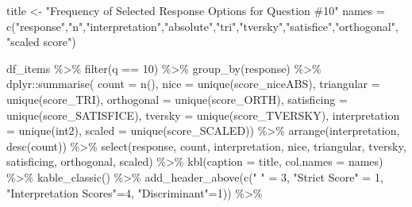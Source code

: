 \documentclass[
  letterpaper,
  DIV=11,
  numbers=noendperiod]{scrreprt}
\newenvironment{Shaded}{\begin{snugshade}}{\end{snugshade}}
\newcommand{\AttributeTok}[1]{\textcolor[rgb]{0.40,0.45,0.13}{#1}}
\newcommand{\DecValTok}[1]{\textcolor[rgb]{0.68,0.00,0.00}{#1}}
\newcommand{\FunctionTok}[1]{\textcolor[rgb]{0.28,0.35,0.67}{#1}}
\newcommand{\NormalTok}[1]{\textcolor[rgb]{0.00,0.23,0.31}{#1}}
\newcommand{\OtherTok}[1]{\textcolor[rgb]{0.00,0.23,0.31}{#1}}
\newcommand{\SpecialCharTok}[1]{\textcolor[rgb]{0.37,0.37,0.37}{#1}}
\newcommand{\StringTok}[1]{\textcolor[rgb]{0.13,0.47,0.30}{#1}}
\begin{document}
\begin{Shaded}
\begin{Highlighting}[]
\NormalTok{title }\OtherTok{\textless{}{-}} \StringTok{"Frequency of Selected Response Options for Question \#10"}
\NormalTok{names }\OtherTok{=} \FunctionTok{c}\NormalTok{(}\StringTok{"response"}\NormalTok{,}\StringTok{"n"}\NormalTok{,}\StringTok{"interpretation"}\NormalTok{,}\StringTok{"absolute"}\NormalTok{,}\StringTok{"tri"}\NormalTok{,}\StringTok{"tversky"}\NormalTok{,}\StringTok{"satisfice"}\NormalTok{,}\StringTok{"orthogonal"}\NormalTok{, }\StringTok{"scaled score"}\NormalTok{)}

\NormalTok{df\_items }\SpecialCharTok{\%\textgreater{}\%} \FunctionTok{filter}\NormalTok{(q }\SpecialCharTok{==} \DecValTok{10}\NormalTok{) }\SpecialCharTok{\%\textgreater{}\%} \FunctionTok{group\_by}\NormalTok{(response) }\SpecialCharTok{\%\textgreater{}\%}
\NormalTok{  dplyr}\SpecialCharTok{::}\FunctionTok{summarise}\NormalTok{( }\AttributeTok{count =} \FunctionTok{n}\NormalTok{(),}
                    \AttributeTok{nice =} \FunctionTok{unique}\NormalTok{(score\_niceABS),}
                    \AttributeTok{triangular =} \FunctionTok{unique}\NormalTok{(score\_TRI),}
                    \AttributeTok{orthogonal =}  \FunctionTok{unique}\NormalTok{(score\_ORTH),}
                    \AttributeTok{satisficing =}  \FunctionTok{unique}\NormalTok{(score\_SATISFICE),}
                    \AttributeTok{tversky =} \FunctionTok{unique}\NormalTok{(score\_TVERSKY),}
                    \AttributeTok{interpretation =} \FunctionTok{unique}\NormalTok{(int2),}
                    \AttributeTok{scaled =} \FunctionTok{unique}\NormalTok{(score\_SCALED)) }\SpecialCharTok{\%\textgreater{}\%}
  \FunctionTok{arrange}\NormalTok{(interpretation, }\FunctionTok{desc}\NormalTok{(count)) }\SpecialCharTok{\%\textgreater{}\%}
  \FunctionTok{select}\NormalTok{(response, count, interpretation, nice,}
\NormalTok{         triangular, tversky, satisficing, orthogonal, scaled) }\SpecialCharTok{\%\textgreater{}\%}
  \FunctionTok{kbl}\NormalTok{(}\AttributeTok{caption =}\NormalTok{ title, }\AttributeTok{col.names =}\NormalTok{ names) }\SpecialCharTok{\%\textgreater{}\%}  \FunctionTok{kable\_classic}\NormalTok{() }\SpecialCharTok{\%\textgreater{}\%}
  \FunctionTok{add\_header\_above}\NormalTok{(}\FunctionTok{c}\NormalTok{(}\StringTok{" "} \OtherTok{=} \DecValTok{3}\NormalTok{, }\StringTok{"Strict Score"} \OtherTok{=} \DecValTok{1}\NormalTok{, }\StringTok{"Interpretation Scores"}\OtherTok{=}\DecValTok{4}\NormalTok{, }\StringTok{"Discriminant"}\OtherTok{=}\DecValTok{1}\NormalTok{)) }\SpecialCharTok{\%\textgreater{}\%}

\end{Highlighting}
\end{Shaded}
\end{document}
